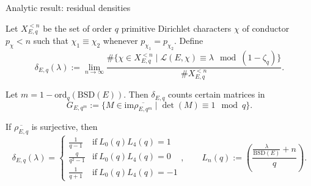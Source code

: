 \documentclass[10pt]{beamer}
\begin{document}
\begin{frame}[t]{Analytic result: residual densities}

Let $ X_{E, q}^{< n} $ be the set of order $ q $ primitive Dirichlet characters $ \chi $ of conductor $ p_\chi < n $ such that $ \chi_1 \equiv \chi_2 $ whenever $ p_{\chi_1} = p_{\chi_2} $. Define
$$ \delta_{E, q}(\lambda) := \lim_{n \to \infty} \dfrac{\#\{\chi \in X_{E, q}^{< n} \mid \mathcal{L}(E, \chi) \equiv \lambda \mod (1 - \zeta_q)\}}{\#X_{E, q}^{< n}}. $$

\pause

\begin{theorem}[A. 2024]
Let $ m = 1 - \mathrm{ord}_q(\mathrm{BSD}(E)) $. Then $ \delta_{E, q} $ counts certain matrices in $$ G_{E, q^m} := \{M \in \mathrm{im}\overline{\rho_{E, q^m}} \mid \det(M) \equiv 1 \mod q\}. $$

\pause

If $ \overline{\rho_{E, q}} $ is surjective, then $$ \delta_{E, q}(\lambda) = \begin{cases} \tfrac{1}{q - 1} & \text{if} \ L_0(q)L_4(q) = 1 \\ \tfrac{q}{q^2 - 1} & \text{if} \ L_0(q)L_4(q) = 0 \\ \tfrac{1}{q + 1} & \text{if} \ L_0(q)L_4(q) = -1 \end{cases}, \qquad L_n(q) := \left(\dfrac{\tfrac{\lambda}{\mathrm{BSD}(E)} + n}{q}\right). $$
\end{theorem}

\end{frame}
\end{document}
